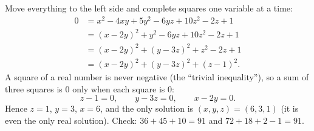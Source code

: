 Move everything to the left side and complete squares one variable at a time:
\begin{align*}
0&=x^2-4xy+5y^2-6yz+10z^2-2z+1\\
&=(x-2y)^2+y^2-6yz+10z^2-2z+1\\
&=(x-2y)^2+(y-3z)^2+z^2-2z+1\\
&=(x-2y)^2+(y-3z)^2+(z-1)^2.
\end{align*}
A square of a real number is never negative (the ``trivial inequality''), so a sum of three squares is $0$ only when each square is $0$:
\[z-1=0,\qquad y-3z=0,\qquad x-2y=0.\]
Hence $z=1$, $y=3$, $x=6$, and the only solution is $\boxed{(x,y,z)=(6,3,1)}$ (it is even the only real solution). Check: $36+45+10=91$ and $72+18+2-1=91$.
